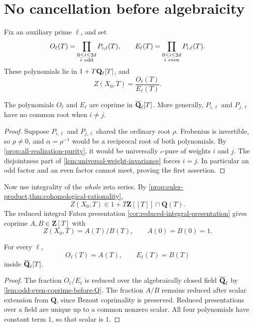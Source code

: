 \section{No cancellation before algebraicity}

Fix an auxiliary prime \(\ell\), and set
\[
  O_\ell(T)=\prod_{\substack{0\leq i\leq2d\\ i\ {\rm odd}}}
       P_{i,\ell}(T),\qquad
  E_\ell(T)=\prod_{\substack{0\leq i\leq2d\\ i\ {\rm even}}}
       P_{i,\ell}(T).
\]
These polynomials lie in \(1+T\mathbf Q_\ell[T]\), and
\[
  Z(X_0,T)=\frac{O_\ell(T)}{E_\ell(T)}.
  \tag{14.2}\label{eq:odd-even-zeta-final}
\]

\begin{lemma}
\label{lem:odd-even-coprime-before-Q}
The polynomials \(O_\ell\) and \(E_\ell\) are coprime in
\(\overline{\mathbf Q}_\ell[T]\).  More generally, \(P_{i,\ell}\) and \(P_{j,\ell}\) have
no common root when \(i\neq j\).
\end{lemma}

\begin{proof}
Suppose \(P_{i,\ell}\) and \(P_{j,\ell}\) shared the ordinary root
\(\rho\).  Frobenius is invertible, so \(\rho\neq0\), and
\(\alpha=\rho^{-1}\) would be a reciprocal root of both polynomials.
By \cref{prop:all-realization-purity}, it would be universally
\(\iota\)-pure of weights \(i\) and \(j\).  The disjointness part of
\cref{lem:universal-weight-invariance} forces \(i=j\).  In particular an
odd factor and an even factor cannot meet, proving the first assertion.
\end{proof}

Now use integrality of the \emph{whole} zeta series.  By
\cref{prop:euler-product,thm:cohomological-rationality},
\[
 Z(X_0,T)\in1+T\mathbf Z[[T]]\cap\mathbf Q(T).
\]
The reduced integral Fatou presentation
\cref{cor:reduced-integral-presentation} gives coprime
\(A,B\in\mathbf Z[T]\) with
\[
  Z(X_0,T)=A(T)/B(T),\qquad A(0)=B(0)=1.
  \tag{14.3}\label{eq:reduced-integral-zeta}
\]

\begin{proposition}
\label{prop:parity-products-integral}
For every \(\ell\),
\[
  O_\ell(T)=A(T),\qquad E_\ell(T)=B(T)
\]
inside \(\overline{\mathbf Q}_\ell[T]\).
\end{proposition}

\begin{proof}
The fraction \(O_\ell/E_\ell\) is reduced over the algebraically closed
field \(\overline{\mathbf Q}_\ell\) by
\cref{lem:odd-even-coprime-before-Q}.  The fraction \(A/B\) remains
reduced after scalar extension from \(\mathbf Q\), since Bezout
coprimality is preserved.  Reduced presentations over a field are unique
up to a common nonzero scalar.  All four polynomials have constant term
\(1\), so that scalar is \(1\).
\end{proof}

